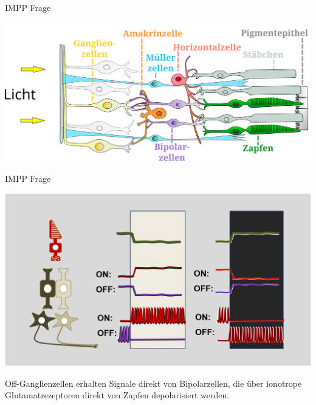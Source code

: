 \documentclass{beamer}
\begin{document}


\begin{frame}{IMPP Frage}
\begin{center}
    \includegraphics[width=\textwidth]{Retina_de.png}
\end{center}
\end{frame}


\begin{frame}{IMPP Frage}
\begin{center}
    \includegraphics[width=\textwidth]{on_off_bipolarzellen.png}
\end{center}

Off-Ganglienzellen erhalten Signale direkt von Bipolarzellen, die  über ionotrope Glutamatrezeptoren direkt von Zapfen depolarisiert werden.

\end{frame}



\end{document}
